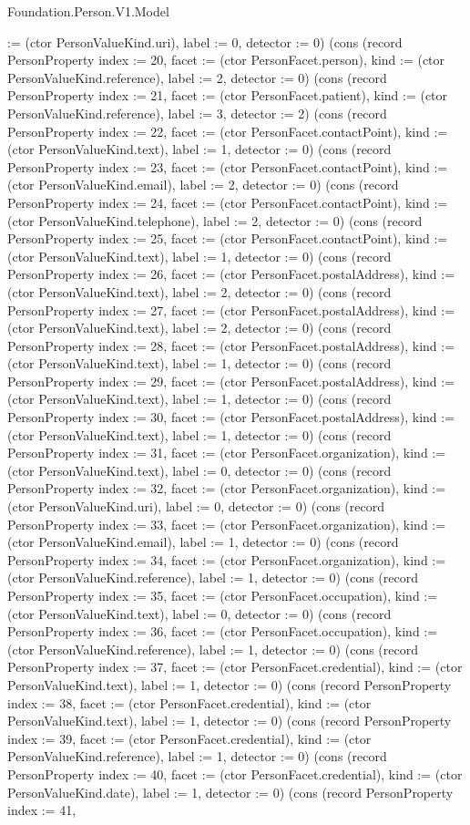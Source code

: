\begin{lexlean}{Foundation.Person.V1.Model}
\begin{semanticmodule}
{:= (ctor PersonValueKind.uri), label := 0, detector := 0}) (cons (record PersonProperty {index := 20, facet := (ctor PersonFacet.person), kind := (ctor PersonValueKind.reference), label := 2, detector := 0}) (cons (record PersonProperty {index := 21, facet := (ctor PersonFacet.patient), kind := (ctor PersonValueKind.reference), label := 3, detector := 2}) (cons (record PersonProperty {index := 22, facet := (ctor PersonFacet.contactPoint), kind := (ctor PersonValueKind.text), label := 1, detector := 0}) (cons (record PersonProperty {index := 23, facet := (ctor PersonFacet.contactPoint), kind := (ctor PersonValueKind.email), label := 2, detector := 0}) (cons (record PersonProperty {index := 24, facet := (ctor PersonFacet.contactPoint), kind := (ctor PersonValueKind.telephone), label := 2, detector := 0}) (cons (record PersonProperty {index := 25, facet := (ctor PersonFacet.contactPoint), kind := (ctor PersonValueKind.text), label := 1, detector := 0}) (cons (record PersonProperty {index := 26, facet := (ctor PersonFacet.postalAddress), kind := (ctor PersonValueKind.text), label := 2, detector := 0}) (cons (record PersonProperty {index := 27, facet := (ctor PersonFacet.postalAddress), kind := (ctor PersonValueKind.text), label := 2, detector := 0}) (cons (record PersonProperty {index := 28, facet := (ctor PersonFacet.postalAddress), kind := (ctor PersonValueKind.text), label := 1, detector := 0}) (cons (record PersonProperty {index := 29, facet := (ctor PersonFacet.postalAddress), kind := (ctor PersonValueKind.text), label := 1, detector := 0}) (cons (record PersonProperty {index := 30, facet := (ctor PersonFacet.postalAddress), kind := (ctor PersonValueKind.text), label := 1, detector := 0}) (cons (record PersonProperty {index := 31, facet := (ctor PersonFacet.organization), kind := (ctor PersonValueKind.text), label := 0, detector := 0}) (cons (record PersonProperty {index := 32, facet := (ctor PersonFacet.organization), kind := (ctor PersonValueKind.uri), label := 0, detector := 0}) (cons (record PersonProperty {index := 33, facet := (ctor PersonFacet.organization), kind := (ctor PersonValueKind.email), label := 1, detector := 0}) (cons (record PersonProperty {index := 34, facet := (ctor PersonFacet.organization), kind := (ctor PersonValueKind.reference), label := 1, detector := 0}) (cons (record PersonProperty {index := 35, facet := (ctor PersonFacet.occupation), kind := (ctor PersonValueKind.text), label := 0, detector := 0}) (cons (record PersonProperty {index := 36, facet := (ctor PersonFacet.occupation), kind := (ctor PersonValueKind.reference), label := 1, detector := 0}) (cons (record PersonProperty {index := 37, facet := (ctor PersonFacet.credential), kind := (ctor PersonValueKind.text), label := 1, detector := 0}) (cons (record PersonProperty {index := 38, facet := (ctor PersonFacet.credential), kind := (ctor PersonValueKind.text), label := 1, detector := 0}) (cons (record PersonProperty {index := 39, facet := (ctor PersonFacet.credential), kind := (ctor PersonValueKind.reference), label := 1, detector := 0}) (cons (record PersonProperty {index := 40, facet := (ctor PersonFacet.credential), kind := (ctor PersonValueKind.date), label := 1, detector := 0}) (cons (record PersonProperty {index := 41, }
\end{semanticmodule}
\end{lexlean}
